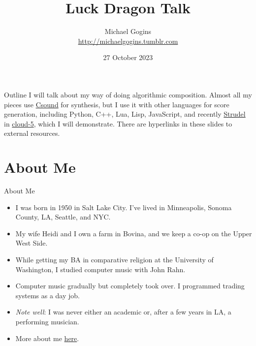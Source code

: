 \documentclass{beamer}
\title[Luck Dragon] %
{Luck Dragon Talk}
\author[Gogins] %
{Michael Gogins \\ \url{http://michaelgogins.tumblr.com} }
\institute[Irreducible Productions] %
{
  Irreducible Productions\\
  New York
}
\date[27 October 2023] %
{27 October 2023}
\begin{document}

\begin{frame}
  \titlepage
\end{frame}

\begin{frame}{Outline}
	I will talk about my way of doing algorithmic composition. Almost all my pieces use \href{http://csound.github.io}{Csound} for synthesis, but I use it with other languages for score generation, including Python, C++, Lua, Lisp, JavaScript, and recently \href{https://github.com/tidalcycles/strudel}{Strudel} in \href{https://gogins.github.io/cloud-5.html}{cloud-5}, which I will demonstrate. There are hyperlinks in these slides to external resources.
\tableofcontents
\end{frame}

\section{About Me}
\begin{frame}{About Me}

\begin{itemize}
\item I was born in 1950 in Salt Lake City. I've lived in Minneapolis, Sonoma County, LA, Seattle, and NYC.
\item My wife Heidi and I own a farm in Bovina, and we keep a co-op on the Upper West Side.
\item While getting my BA in comparative religion at the University of Washington, I studied computer music with John Rahn.
\item Computer music gradually but completely took over. I programmed trading systems as a day job.
\item \emph{Note well}: I was never either an academic or, after a few years in LA, a performing musician.
\item More about me \href{https://michaelgogins.tumblr.com}{here}.
\end{itemize}

\end{frame}
\end{document}
